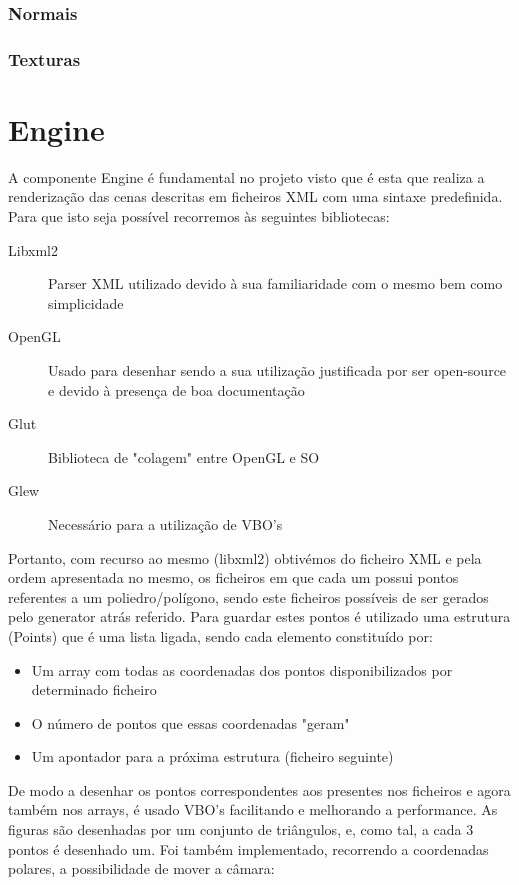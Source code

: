 \documentclass{article}
\begin{document}
\subsubsection{Normais}

\subsubsection{Texturas}

\section{Engine}
A componente Engine é fundamental no projeto visto que é esta que realiza a renderização das cenas descritas em ficheiros XML com uma sintaxe predefinida.
Para que isto seja possível recorremos às seguintes bibliotecas:
\begin{description}
    \item [Libxml2] Parser XML utilizado devido à sua familiaridade com o mesmo bem como simplicidade
    \item [OpenGL] Usado para desenhar sendo a sua utilização justificada por ser open-source e devido à presença de boa documentação
    \item [Glut] Biblioteca de "colagem" entre OpenGL e SO
    \item [Glew] Necessário para a utilização de VBO's
\end{description}
Portanto, com recurso ao mesmo (libxml2) obtivémos do ficheiro XML e pela ordem apresentada no mesmo, os ficheiros em que cada um possui pontos referentes a um poliedro/polígono, sendo este ficheiros possíveis de ser gerados pelo generator atrás referido. 
Para guardar estes pontos é utilizado uma estrutura (Points) que é uma lista ligada, sendo cada elemento constituído por:
\begin{itemize}
    \item Um array com todas as coordenadas dos pontos disponibilizados por determinado ficheiro
    \item O número de pontos que essas coordenadas "geram"
    \item Um apontador para a próxima estrutura (ficheiro seguinte)
\end{itemize}
De modo a desenhar os pontos correspondentes aos presentes nos ficheiros e agora também nos arrays, é usado VBO's facilitando e melhorando a performance. As figuras são desenhadas por um conjunto de triângulos, e, como tal, a cada 3 pontos é desenhado um. 
Foi também implementado, recorrendo a coordenadas polares, a possibilidade de mover a câmara:
\end{document}
